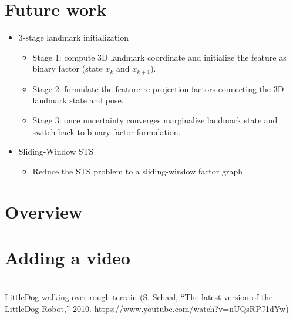 \documentclass[%
    fourtothree=true, %
    DepLogo=true     %
    ]{ETHpres}
\begin{document}
\section*{Future work}
\begin{itemize}
	\item[\ETHitem] 3-stage landmark initialization
	\begin{itemize}
		\item Stage 1: compute 3D landmark coordinate and initialize the feature as binary factor (state $x_k$ and $x_{k+1}$).
		\item Stage 2: formulate the feature re-projection factors connecting the 3D landmark state and pose.
		\item Stage 3: once uncertainty converges marginalize landmark state and switch back to binary factor formulation.
	\end{itemize}
 	\item[\ETHitem] Sliding-Window STS
	\begin{itemize}
		\item Reduce the STS problem to a sliding-window factor graph		
	\end{itemize} 	
\end{itemize}

\clearpage




\ETHslide
\section*{Overview}
\tableofcontents

\clearpage

\ETHslide
\section*{Adding a video}
\\
		\footnotesize{LittleDog walking over rough terrain (S. Schaal, ``The latest version of the LittleDog Robot,'' 2010. https://www.youtube.com/watch?v=nUQsRPJ1dYw)}

			
\clearpage


\ETHslide
\end{document}
